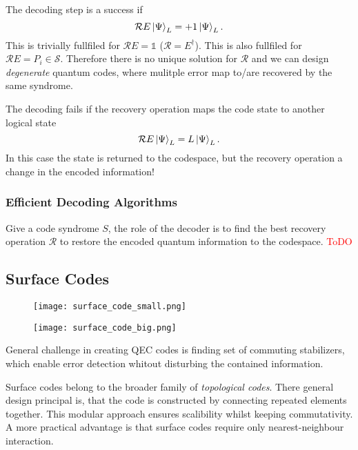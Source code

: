 The decoding step is a success if 
\begin{equation}
    \mathcal{R}E \ket{\Psi}_L = +1 \ket{\Psi}_L.
\end{equation}
This is trivially fullfiled for $\mathcal{R}E=\mathds{1}$ ($\mathcal{R}=E^\dagger$). 
This is also fullfiled for $\mathcal{R}E=P_i \in \mathcal{S}$.
Therefore there is no unique solution for $\mathcal{R}$ and we can design \textit{degenerate} quantum codes,
where mulitple error map to/are recovered by the same syndrome.

The decoding fails if the recovery operation maps the code state to another logical state
\begin{equation}
    \mathcal{R}E \ket{\Psi}_L = L\ket{\Psi}_L.
\end{equation}
In this case the state is returned to the codespace, 
but the recovery operation a change in the encoded information!

\subsubsection{Efficient Decoding Algorithms}
Give a code syndrome $S$, the role of the decoder is to find the best recovery operation $\mathcal{R}$ to restore the encoded quantum information to the codespace.
\textcolor{red}{ToDO}

\subsection{Surface Codes}

\begin{figure}[h]
    \begin{center}
        \texttt{[image: surface\_code\_small.png]}
    \end{center}
    \label{fig:basic.qc.surface_code_small}
\end{figure}
\begin{figure}[h]
    \begin{center}
        \texttt{[image: surface\_code\_big.png]}
    \end{center}
    \label{fig:basic.qc.surface_code_big}
\end{figure}
General challenge in creating QEC codes is finding set of commuting stabilizers, 
which enable error detection whitout disturbing the contained information.

Surface codes belong to the broader family of \textit{topological codes}.
There general design principal is, that the code is constructed by connecting repeated elements together. 
This modular approach ensures scalibility whilst keeping commutativity.
A more practical advantage is that surface codes require only nearest-neighbour interaction.

